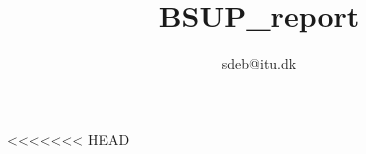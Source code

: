 \documentclass[10pt,a4paper]{article}
\author{sdeb@itu.dk}
\title{BSUP_report}
\begin{document}
\tableofcontents
\newpage




<<<<<<< HEAD

\end{document}
